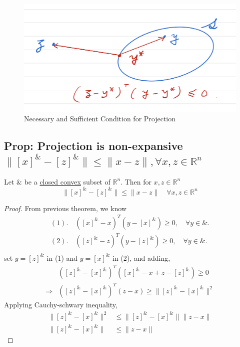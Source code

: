 \documentclass[11pt]{elegantbook}
\begin{document}
\begin{center}\begin{figure}[htbp]
    \centering
    \includegraphics[scale=0.3]{projection3.png}
    \caption{Necessary and Sufficient Condition for Projection}
    \label{}
\end{figure}\end{center}

\subsection{Prop: Projection is non-expansive $\|[x]^\&-[z]^\&\|\leq \|x-z\|,\forall x,z\in \mathbb{R}^n$}
\begin{proposition}
    Let $\&$ be a \underline{closed convex} subset of $\mathbb{R}^n$. Then for $x,z\in \mathbb{R}^n$
    $$\|[x]^\&-[z]^\&\|\leq \|x-z\|\quad \forall x,z\in \mathbb{R}^n$$
\end{proposition}
\begin{proof}
From previous theorem, we know
\begin{equation}
    \begin{aligned}
        (1).\quad ([x]^\&-x)^T(y-[x]^\&)\geq 0,\quad \forall y\in\&.\\
        (2).\quad ([z]^\&-z)^T(y-[z]^\&)\geq 0,\quad \forall y\in\&.\\
    \end{aligned}
    \nonumber
\end{equation}
set $y=[z]^\&$ in (1) and $y=[x]^\&$ in (2), and adding,
\begin{equation}
    \begin{aligned}
        &([z]^\&-[x]^\&)^T([x]^\&-x+z-[z]^\&)\geq 0\\
        \Rightarrow	& ([z]^\&-[x]^\&)^T(z-x)\geq \|[z]^\&-[x]^\&\|^2
    \end{aligned}
    \nonumber
\end{equation}
Applying Cauchy-schwary inequality,
\begin{equation}
    \begin{aligned}
        \|[z]^\&-[x]^\&\|^2&\leq \|[z]^\&-[x]^\&\|\|z-x\|\\
        \|[z]^\&-[x]^\&\|&\leq \|z-x\|
    \end{aligned}
    \nonumber
\end{equation}
\end{proof}
\end{document}
